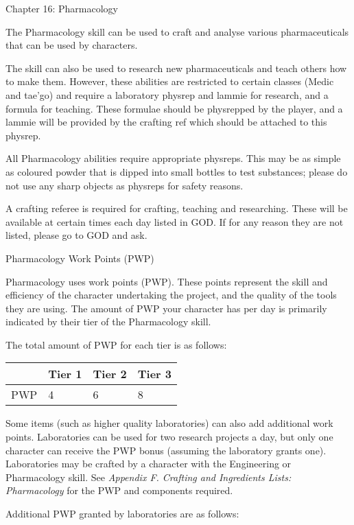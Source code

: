 \documentclass{scrbook}
\begin{document}
Chapter 16: Pharmacology

The Pharmacology skill can be used to craft and analyse various pharmaceuticals that can be used by characters.

The skill can also be used to research new pharmaceuticals and teach others how to make them. However, these abilities are restricted to certain classes (Medic and tae'go) and require a laboratory physrep and lammie for research, and a formula for teaching. These formulae should be physrepped by the player, and a lammie will be provided by the crafting ref which should be attached to this physrep.

All Pharmacology abilities require appropriate physreps. This may be as simple as coloured powder that is dipped into small bottles to test substances; please do not use any sharp objects as physreps for safety reasons.

A crafting referee is required for crafting, teaching and researching. These will be available at certain times each day listed in GOD. If for any reason they are not listed, please go to GOD and ask.

Pharmacology Work Points (PWP)

Pharmacology uses work points (PWP). These points represent the skill and efficiency of the character undertaking the project, and the quality of the tools they are using. The amount of PWP your character has per day is primarily indicated by their tier of the Pharmacology skill.

The total amount of PWP for each tier is as follows:

\begin{table}
\begin{tabular}{|l|l|l|l|} \hline 
 & Tier 1 & Tier 2 & Tier 3 \\
 \hline PWP & 4 & 6 & 8 \\
 \hline \end{tabular}

\end{table}

Some items (such as higher quality laboratories) can also add additional work points. Laboratories can be used for two research projects a day, but only one character can receive the PWP bonus (assuming the laboratory grants one). Laboratories may be crafted by a character with the Engineering or Pharmacology skill. See \textit{Appendix F. Crafting and Ingredients Lists: Pharmacology} for the PWP and components required.

Additional PWP granted by laboratories are as follows:
\end{document}

